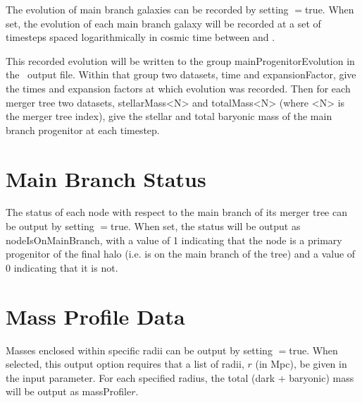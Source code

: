 The evolution of main branch galaxies can be recorded by setting {\normalfont \ttfamily [timestepRecordEvolution]}$=${\normalfont \ttfamily true}. When set, the evolution of each main branch galaxy will be recorded at a set of {\normalfont \ttfamily [timestepRecordEvolutionSteps]} timesteps spaced logarithmically in cosmic time between {\normalfont \ttfamily [timestepRecordEvolutionBegin]} and \newline {\normalfont \ttfamily [timestepRecordEvolutionEnd]}. 

This recorded evolution will be written to the group {\normalfont \ttfamily mainProgenitorEvolution} in the \glc\ output file. Within that group two datasets, {\normalfont \ttfamily time} and {\normalfont \ttfamily expansionFactor}, give the times and expansion factors at which evolution was recorded. Then for each merger tree two datasets, {\normalfont \ttfamily stellarMass<N>} and {\normalfont \ttfamily totalMass<N>} (where {\normalfont \ttfamily <N>} is the merger tree index), give the stellar and total baryonic mass of the main branch progenitor at each timestep.

\section{Main Branch Status}

The status of each node with respect to the main branch of its merger tree can be output by setting {\normalfont \ttfamily [outputMainBranchStatus]}$=${\normalfont \ttfamily true}. When set, the status will be output as {\normalfont \ttfamily nodeIsOnMainBranch}, with a value of 1 indicating that the node is a primary progenitor of the final halo (i.e. is on the main branch of the tree) and a value of 0 indicating that it is not.

\section{Mass Profile Data}

Masses enclosed within specific radii can be output by setting {\normalfont \ttfamily [outputMassProfileData]}$=${\normalfont \ttfamily true}. When selected, this output option requires that a list of radii, $r$ (in Mpc), be given in the {\normalfont \ttfamily [outputMassProfileRadii]} input parameter. For each specified radius, the total (dark + baryonic) mass will be output as {\normalfont \ttfamily massProfile}$r$.

